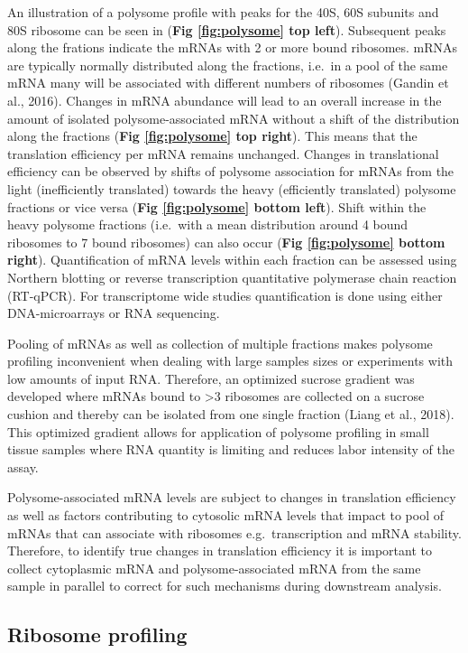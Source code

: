 \documentclass[12pt,openany]{book}
\begin{document}
An illustration of a polysome profile with peaks for the 40S, 60S
subunits and 80S ribosome can be seen in (\textbf{Fig \ref{fig:polysome}
top left}). Subsequent peaks along the frations indicate the mRNAs with
2 or more bound ribosomes. mRNAs are typically normally distributed
along the fractions, i.e.~in a pool of the same mRNA many will be
associated with different numbers of ribosomes (Gandin et al., 2016).
Changes in mRNA abundance will lead to an overall increase in the amount
of isolated polysome-associated mRNA without a shift of the distribution
along the fractions (\textbf{Fig \ref{fig:polysome} top right}). This
means that the translation efficiency per mRNA remains unchanged.
Changes in translational efficiency can be observed by shifts of
polysome association for mRNAs from the light (inefficiently translated)
towards the heavy (efficiently translated) polysome fractions or vice
versa (\textbf{Fig \ref{fig:polysome} bottom left}). Shift within the
heavy polysome fractions (i.e.~with a mean distribution around 4 bound
ribosomes to 7 bound ribosomes) can also occur (\textbf{Fig
\ref{fig:polysome} bottom right}). Quantification of mRNA levels within
each fraction can be assessed using Northern blotting or reverse
transcription quantitative polymerase chain reaction (RT-qPCR). For
transcriptome wide studies quantification is done using either
DNA-microarrays or RNA sequencing.

Pooling of mRNAs as well as collection of multiple fractions makes
polysome profiling inconvenient when dealing with large samples sizes or
experiments with low amounts of input RNA. Therefore, an optimized
sucrose gradient was developed where mRNAs bound to \textgreater{}3
ribosomes are collected on a sucrose cushion and thereby can be isolated
from one single fraction (Liang et al., 2018). This optimized gradient
allows for application of polysome profiling in small tissue samples
where RNA quantity is limiting and reduces labor intensity of the assay.

Polysome-associated mRNA levels are subject to changes in translation
efficiency as well as factors contributing to cytosolic mRNA levels that
impact to pool of mRNAs that can associate with ribosomes
e.g.~transcription and mRNA stability. Therefore, to identify true
changes in translation efficiency it is important to collect cytoplasmic
mRNA and polysome-associated mRNA from the same sample in parallel to
correct for such mechanisms during downstream analysis.

\subsection{Ribosome profiling} \label{riboseq}
\end{document}
